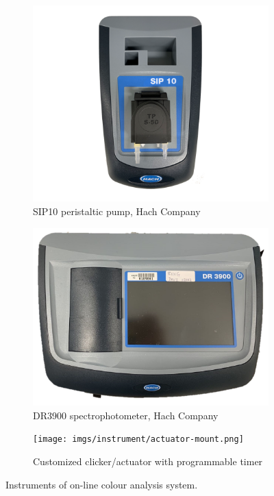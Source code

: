 \begin{figure}[h]
    \centering
    \begin{subfigure}{0.3\textwidth}
      \includegraphics[width=\linewidth]{imgs/instrument/SIP10.png}
      \caption{SIP10 peristaltic pump, Hach Company} \label{fig:hach-sip}
    \end{subfigure}%
    \hspace{2em}   %
    \begin{subfigure}{0.3\textwidth}
      \includegraphics[width=\linewidth]{imgs/instrument/DR3900_PS.png}
      \caption{DR3900 spectrophotometer, Hach Company} \label{fig:hach-dr3900}
    \end{subfigure}%
    \vspace{2em}
    \begin{subfigure}{0.7\textwidth}
        \texttt{[image: imgs/instrument/actuator-mount.png]}
        \caption{Customized clicker/actuator with programmable timer} \label{fig:hach-actuator}
    \end{subfigure}%
  \caption{Instruments of on-line colour analysis system.} \label{fig:hach}
\end{figure}

